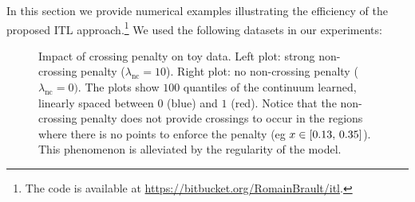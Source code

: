 %
%
%
%
%
%
%
%
%
%
In this section we provide numerical examples illustrating the efficiency of
the proposed \acs{ITL} approach.\footnote{The code is available at
    \url{https://bitbucket.org/RomainBrault/itl}.} We used the following
datasets in our experiments: \par
\begin{figure*}[!tp]
    \centering
    \centering{}
    \caption{Impact of crossing penalty on toy data. Left plot: strong
    non-crossing penalty ($\lambda_{\text{nc}}=10$). Right plot: no
    non-crossing penalty ($\lambda_{\text{nc}}=0)$. The plots show $100$
    quantiles of the continuum learned, linearly spaced between $0$ (blue) and
    $1$ (red). Notice that the non-crossing penalty does not provide crossings
    to occur in the regions where there is no points to enforce the penalty
    (\acs{eg} $x\in\left[0.13,\,0.35\right]$). This phenomenon is
    alleviated by the regularity of the model.  \label{figure:iqr_crossing}}
\end{figure*}
%
